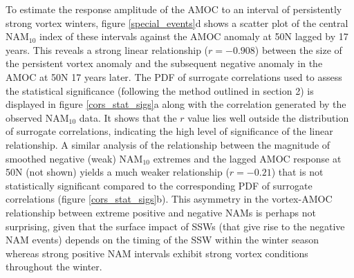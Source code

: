 To estimate the response amplitude of the AMOC to an interval of persistently strong vortex winters, figure \ref{special_events}d shows a scatter plot of the central NAM$_{10}$ index of these intervals against the AMOC anomaly at 50N lagged  by 17 years. This reveals a strong linear relationship ($r = -0.908$) between the size of the persistent vortex anomaly and the subsequent negative anomaly in the AMOC at 50N 17 years later. The PDF of surrogate correlations used to assess the statistical significance (following the method outlined in section 2) is displayed in figure \ref{cors_stat_sigs}a along with the correlation generated by the observed NAM$_{10}$ data. It shows that the $r$ value lies well outside the distribution of surrogate correlations, indicating the high level of significance of the linear relationship. A similar analysis of the relationship between the magnitude of smoothed negative (weak) NAM$_{10}$ extremes and the lagged AMOC response at 50N (not shown) yields a much weaker relationship ($r = -0.21$) that is not statistically significant compared to the corresponding PDF of surrogate correlations (figure \ref{cors_stat_sigs}b). This asymmetry in the vortex-AMOC relationship between extreme positive and negative NAMs  is perhaps not surprising, given that the surface impact of SSWs (that give rise to the negative NAM events) depends on the timing of the SSW within the winter season whereas strong positive NAM intervals exhibit strong vortex conditions throughout the winter. 

